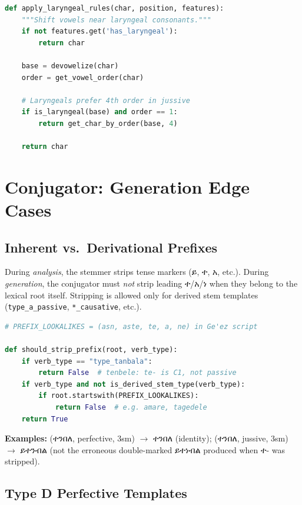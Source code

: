\documentclass[conference]{IEEEtran}
\newcommand{\geez}[1]{{\ethiopicfont #1}}
\begin{document}
\begin{lstlisting}[language=Python]
def apply_laryngeal_rules(char, position, features):
    """Shift vowels near laryngeal consonants."""
    if not features.get('has_laryngeal'):
        return char
    
    base = devowelize(char)
    order = get_vowel_order(char)
    
    # Laryngeals prefer 4th order in jussive
    if is_laryngeal(base) and order == 1:
        return get_char_by_order(base, 4)
    
    return char
\end{lstlisting}

\section{Conjugator: Generation Edge Cases}

\subsection{Inherent vs.\ Derivational Prefixes}

During \emph{analysis}, the stemmer strips tense markers (\geez{ይ}, \geez{ተ}, \geez{አ}, etc.). During \emph{generation}, the conjugator must \emph{not} strip leading \geez{ተ}/\geez{አ}/\geez{ነ} when they belong to the lexical root itself. Stripping is allowed only for derived stem templates (\texttt{type\_a\_passive}, \texttt{*\_causative}, etc.).

\begin{lstlisting}[language=Python]
# PREFIX_LOOKALIKES = (asn, aste, te, a, ne) in Ge'ez script

def should_strip_prefix(root, verb_type):
    if verb_type == "type_tanbala":
        return False  # tenbele: te- is C1, not passive
    if verb_type and not is_derived_stem_type(verb_type):
        if root.startswith(PREFIX_LOOKALIKES):
            return False  # e.g. amare, tagedele
    return True
\end{lstlisting}

\textbf{Examples:} (\geez{ተንበለ}, perfective, 3sm) $\rightarrow$ \geez{ተንበለ} (identity); (\geez{ተንበለ}, jussive, 3sm) $\rightarrow$ \geez{ይተንብል} (not the erroneous double-marked \geez{ይተነብል} produced when \geez{ተ-} was stripped).

\subsection{Type D Perfective Templates}
\end{document}
